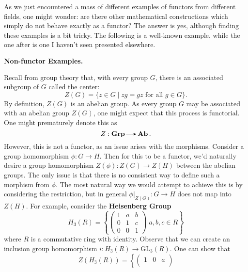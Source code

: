     As we just encountered a mass of different examples of functors from 
    different fields, one might wonder: are there other mathematical constructions 
    which simply do not behave exactly as a functor? The answer is yes, although 
    finding these examples is a bit tricky. The following is a well-known 
    example, while the one after is one I haven't seen presented elsewhere.
    \vspace{0.5cm}

    {\large\noindent \textbf{Non-functor Examples.}\par}
    
    \begin{example}
        Recall from group theory that, with every group $G$, 
        there is an associated subgroup of $G$ called the center:
        \[
            Z(G) = \{ z \in G \mid zg = gz \text{ for all } g \in G\}.
        \]
        By definition, $Z(G)$ is an abelian group. As every group $G$ may be 
        associated with an abelian group $Z(G)$, one might expect that this 
        process is functorial. One might prematurely denote this as
        \[
            Z: \grp \to \ab.
        \]
        However, this is not a functor, as an issue arises with the morphisms. 
        Consider a group homomorphism $\phi: G \to H$. Then for this to be a functor, 
        we'd naturally desire a group homomorphism $Z(\phi): Z(G) \to Z(H)$ between 
        the abelian groups. The only issue is that there is no consistent way to 
        define such a morphism from $\phi$. The most natural way we would attempt  
        to achieve this is by considering the restriction, but in general 
        $\phi\big|_{Z(G)}: G \to H$ does not map into $Z(H)$. 
        For example, consider the \textbf{Heisenberg Group}
        \[
            H_3(R)
            = 
            \left\{
            \begin{pmatrix}
                1 & a & b\\
                0 & 1 & c\\
                0 & 0 & 1 
            \end{pmatrix}
            \Bigg|
            a,b,c \in R
            \right\}
        \]
        where $R$ is a commutative ring with identity. Observe that 
        we can create an inclusion group homomorphism $i: H_3(R) \to \text{GL}_3(R)$. 
        One can show that 
        \[
            Z(H_3(R)) = 
            \left\{
                \begin{pmatrix}
                    1 & 0 & a\\

\end{pmatrix}\]
\end{example}

